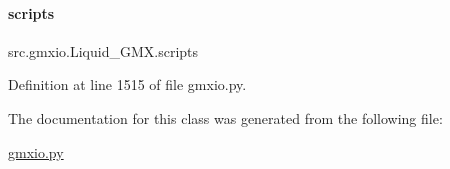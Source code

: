 \mbox{\label{classsrc_1_1gmxio_1_1Liquid__GMX_a523c30b145ad222c848689f58ae91fbc}} 
\paragraph{\texorpdfstring{scripts}{scripts}}
{\footnotesize\ttfamily src.\+gmxio.\+Liquid\+\_\+\+G\+M\+X.\+scripts}



Definition at line 1515 of file gmxio.\+py.



The documentation for this class was generated from the following file\+:\begin{DoxyCompactItemize}
\item 
\hyperlink{gmxio_8py}{gmxio.\+py}\end{DoxyCompactItemize}
